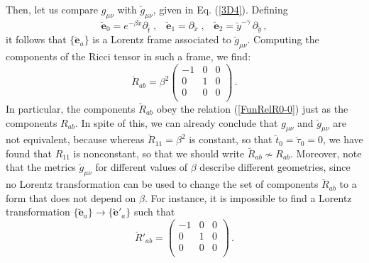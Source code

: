 \documentclass[twocolumn,prd,aps,showpacs,showkeys,amsmath,amssymb]{revtex4-1}
\newcommand{\bl}{\boldsymbol}
\begin{document}
Then, let us compare $g_{\mu\nu}$ with $\breve{g}_{\mu\nu}$, given in Eq. (\ref{3D4}). Defining
\begin{equation*}
  \breve{\bl{e}}_0 = e^{-\beta \breve{x}} \partial_{\breve{t}} \;,\;\;\;
  \breve{\bl{e}}_1 =     \partial_{\breve{x}} \;,\;\;\;
  \breve{\bl{e}}_2 =  \breve{y}^{-\gamma}\,\partial_{\breve{y}} \,,
\end{equation*}
it follows that $\{ \breve{\bl{e}}_a\}$ is a Lorentz frame associated to $\breve{g}_{\mu\nu}$. Computing the components of the Ricci tensor in such a frame, we find:
\begin{equation*}
 \breve{R}_{ab} =  \beta^2 \left(
             \begin{array}{ccc}
               -1 & 0 & 0 \\
               0 & 1 &  0 \\
               0 & 0 & 0 \\
             \end{array}
           \right)\,.
\end{equation*}
In particular, the components $\breve{R}_{ab} $ obey the relation (\ref{FunRelR0-0}) just as the components $R_{ab}$. In spite of this, we can already conclude that $g_{\mu\nu}$ and $\breve{g}_{\mu\nu}$ are not equivalent, because whereas $\breve{R}_{11}=\beta^2 $ is constant, so that $\breve{t}_0=\breve{\tau}_0=0$, we have found that $R_{11}$ is nonconstant, so that we should write $\breve{R}_{ab} \nsim R_{ab}$. Moreover, note that the metrics $\breve{g}_{\mu\nu}$ for different values of $\beta$ describe different geometries, since no Lorentz transformation can be used to change the set of components $\breve{R}_{ab}$ to a form that does not depend on $\beta$. For instance, it is impossible to find a Lorentz transformation $\{\breve{\bl{e}}_a\}\rightarrow \{\breve{\bl{e}}'_a\}$ such that
\begin{equation*}
\breve{R}'_{ab} =   \left(
\begin{array}{ccc}
-1 & 0 & 0 \\
0 & 1 &  0 \\
0 & 0 & 0 \\
\end{array}
\right)\,.
\end{equation*}
\end{document}
